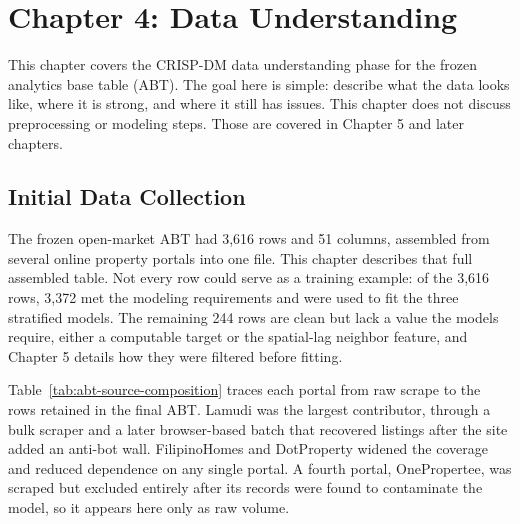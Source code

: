 \section{Chapter 4: Data Understanding}\label{data-understanding}

This chapter covers the CRISP-DM data understanding phase for the frozen analytics base table (ABT). The goal here is simple: describe what the data looks like, where it is strong, and where it still has issues. This chapter does not discuss preprocessing or modeling steps. Those are covered in Chapter 5 and later chapters.

\subsection{Initial Data Collection}\label{initial-data-collection}

The frozen open-market ABT had 3{,}616 rows and 51 columns, assembled from several online property portals into one file. This chapter describes that full assembled table. Not every row could serve as a training example: of the 3{,}616 rows, 3{,}372 met the modeling requirements and were used to fit the three stratified models. The remaining 244 rows are clean but lack a value the models require, either a computable target or the spatial-lag neighbor feature, and Chapter 5 details how they were filtered before fitting.

Table~\ref{tab:abt-source-composition} traces each portal from raw scrape to the rows retained in the final ABT. Lamudi was the largest contributor, through a bulk scraper and a later browser-based batch that recovered listings after the site added an anti-bot wall. FilipinoHomes and DotProperty widened the coverage and reduced dependence on any single portal. A fourth portal, OnePropertee, was scraped but excluded entirely after its records were found to contaminate the model, so it appears here only as raw volume.

